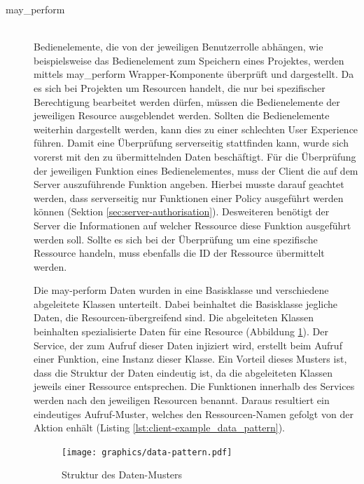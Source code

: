 \begin{description}
	\item[may\_perform]\hfill\\
	Bedienelemente, die von der jeweiligen Benutzerrolle abhängen, wie beispielsweise das Bedienelement zum Speichern eines Projektes, werden mittels may\_perform Wrapper-Komponente überprüft und dargestellt. Da es sich bei Projekten um Resourcen handelt, die nur bei spezifischer Berechtigung bearbeitet werden dürfen, müssen die Bedienelemente der jeweiligen Resource ausgeblendet werden. Sollten die Bedienelemente weiterhin dargestellt werden, kann dies zu einer schlechten User Experience führen. Damit eine Überprüfung serverseitig stattfinden kann, wurde sich vorerst mit den zu übermittelnden Daten beschäftigt. Für die Überprüfung der jeweiligen Funktion eines Bedienelementes, muss der Client die auf dem Server auszuführende Funktion angeben. Hierbei musste darauf geachtet werden, dass serverseitig nur Funktionen einer Policy ausgeführt werden können (Sektion \ref{sec:server-authorisation}). Desweiteren benötigt der Server die Informationen auf welcher Ressource diese Funktion ausgeführt werden soll. Sollte es sich bei der Überprüfung um eine spezifische Ressource handeln, muss ebenfalls die ID der Ressource übermittelt werden.
	
	
	
	Die may-perform Daten wurden in eine Basisklasse und verschiedene abgeleitete Klassen unterteilt. Dabei beinhaltet die Basisklasse jegliche Daten, die Resourcen-übergreifend sind. Die abgeleiteten Klassen beinhalten spezialisierte Daten für eine Resource (Abbildung \ref{fig:client-data-pattern}). Der Service, der zum Aufruf dieser Daten injiziert wird, erstellt beim Aufruf einer Funktion, eine Instanz dieser Klasse. Ein Vorteil dieses Musters ist, dass die Struktur der Daten eindeutig ist, da die abgeleiteten Klassen jeweils einer Ressource entsprechen. Die Funktionen innerhalb des Services werden nach den jeweiligen Resourcen benannt. Daraus resultiert ein eindeutiges Aufruf-Muster, welches den Ressourcen-Namen gefolgt von der Aktion enhält (Listing \ref{lst:client-example_data_pattern}). 
	
	\begin{figure}
		\centering
		\texttt{[image: graphics/data-pattern.pdf]}
		\caption{Struktur des Daten-Musters}
		\label{fig:client-data-pattern}
	\end{figure}


\end{description}
